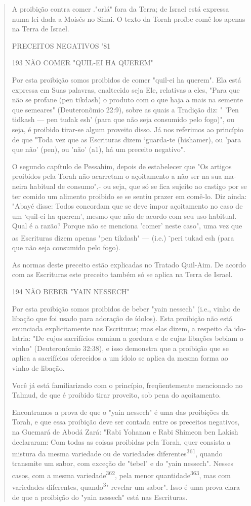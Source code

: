 \begin{quote}
A proibição contra comer ."orlá" fora da Terra; de Israel está expres­sa
numa lei dada a Moisés no Sinai. O texto da Torah proíbe comê-los apenas
na Terra de Israel.

PRECEITOS NEGATIVOS '81

193 NÃO COMER "QUIL-EI HA QUEREM"

Por esta proibição somos proibidos de comer "quil-ei ha querem". Ela
está expressa em Suas palavras, enaltecido seja Ele, relativas a eles,
"Para que não se profane (pen tikdash) o produto com o que haja a mais
na semente que semeares" (Deuteronômio 22:9), sobre as quais a Tradição
diz: " 'Pen tid­kash --- pen tudak esh' (para que não seja consumido
pelo fogo)", ou seja, é proibido tirar-se algum proveito disso. Já nos
referimos ao princípio de que "To­da vez que as Escrituras dizem
`guarda-te (hishamer), ou 'para que não' (pen), ou 'não' (a1), há um
preceito negativo".

O segundo capítulo de Pessahim, depois de estabelecer que "Os ar­tigos
proibidos pela Torah não acarretam o açoitamento a não ser na sua
ma­neira habitual de consumo",- ou seja, que só se fica sujeito ao
castigo por se ter comido um alimento proibido se se sentiu prazer em
comê-lo. Diz ainda: "Abayé disse: Todos concordam que se deve impor
açoitamento no caso de um `quil-ei ha querem', mesmo que não de acordo
com seu uso habitual. Qual é a razão? Porque não se menciona 'comer'
neste caso", uma vez que as Escri­turas dizem apenas "pen tikdash" ---
(i.e.) \textsuperscript{-}peri tukad esh (para que não seja consumido
pelo fogo).

As normas deste preceito estão explicadas no Tratado Quil-Aim. De acordo
com as Escrituras este preceito também só se aplica na Terra de Israel.

194 NÃO BEBER "YAIN NESSECH"

Por esta proibição somos proibidos de beber "yain nessech" (i.e., vinho
de libação que foi usado para adoração de ídolos). Esta proibição não
está enunciada explicitamente nas Escrituras; mas elas dizem, a respeito
da ido­latria: "De cujos sacrifícios comiam a gordura e de cujas
libações bebiam o vi­nho" (Deuteronômio 32:38), e isso demonstra que a
proibição que se aplica a sacrifícios oferecidos a um ídolo se aplica da
mesma forma ao vinho de libação.

Você já está familiarizado com o princípio, freqüentemente mencio­nado
no Talmud, de que é proibido tirar proveito, sob pena do açoitamento.

Encontramos a prova de que o "yain nessech" é uma das proibições da
Torah, e que essa proibição deve ser contada entre os preceitos
negativos, na Guemará de Abodá Zará: "Rabi Yohanan e Rabi Shimeon ben
Lakish decla­raram: Com todas as coisas proibidas pela Torah, quer
consista a mistura da mesma variedade ou de variedades
diferentes\textsuperscript{361}, quando transmite um sabor, com exceção
de "tebel" e do "yain nessech". Nesses casos, com a mesma
variedade\textsuperscript{362}, pela menor
quantidade\textsuperscript{363}, mas com variedades diferentes,
quan­do\textsuperscript{3}" revelar um sabor". Isso é uma prova clara de
que a proibição do "yain nessech" está nas Escrituras.


\end{quote}
